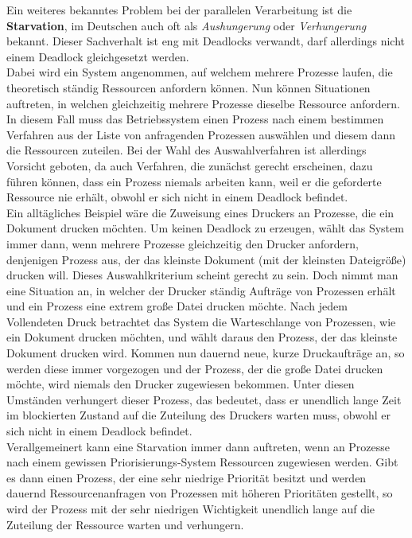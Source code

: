 				Ein weiteres bekanntes Problem bei der parallelen Verarbeitung ist die \textbf{Starvation}, im Deutschen auch oft als \textit{Aushungerung} oder \textit{Verhungerung} bekannt. Dieser Sachverhalt ist eng mit Deadlocks verwandt, darf allerdings nicht einem Deadlock gleichgesetzt werden.\\
				Dabei wird ein System angenommen, auf welchem mehrere Prozesse laufen, die theoretisch ständig Ressourcen anfordern können. Nun können Situationen auftreten, in welchen gleichzeitig mehrere Prozesse dieselbe Ressource anfordern. In diesem Fall muss das Betriebssystem einen Prozess nach einem bestimmen Verfahren aus der Liste von anfragenden Prozessen auswählen und diesem dann die Ressourcen zuteilen. Bei der Wahl des Auswahlverfahren ist allerdings Vorsicht geboten, da auch Verfahren, die zunächst gerecht erscheinen, dazu führen können, dass ein Prozess niemals arbeiten kann, weil er die geforderte Ressource nie erhält, obwohl er sich nicht in einem Deadlock befindet.\\
				Ein alltägliches Beispiel wäre die Zuweisung eines Druckers an Prozesse, die ein Dokument drucken möchten. Um keinen Deadlock zu erzeugen, wählt das System immer dann, wenn mehrere Prozesse gleichzeitig den Drucker anfordern, denjenigen Prozess aus, der das kleinste Dokument (mit der kleinsten Dateigröße) drucken will. Dieses Auswahlkriterium scheint gerecht zu sein. Doch nimmt man eine Situation an, in welcher der Drucker ständig Aufträge von Prozessen erhält und ein Prozess eine extrem große Datei drucken möchte. Nach jedem Vollendeten Druck betrachtet das System die Warteschlange von Prozessen, wie ein Dokument drucken möchten, und wählt daraus den Prozess, der das kleinste Dokument drucken wird. Kommen nun dauernd neue, kurze Druckaufträge an, so werden diese immer vorgezogen und der Prozess, der die große Datei drucken möchte, wird niemals den Drucker zugewiesen bekommen. Unter diesen Umständen verhungert dieser Prozess, das bedeutet, dass er unendlich lange Zeit im blockierten Zustand auf die Zuteilung des Druckers warten muss, obwohl er sich nicht in einem Deadlock befindet.\\
				Verallgemeinert kann eine Starvation immer dann auftreten, wenn an Prozesse nach einem gewissen Priorisierungs-System Ressourcen zugewiesen werden. Gibt es dann einen Prozess, der eine sehr niedrige Priorität besitzt und werden dauernd Ressourcenanfragen von Prozessen mit höheren Prioritäten gestellt, so wird der Prozess mit der sehr niedrigen Wichtigkeit unendlich lange auf die Zuteilung der Ressource warten und verhungern.
			
